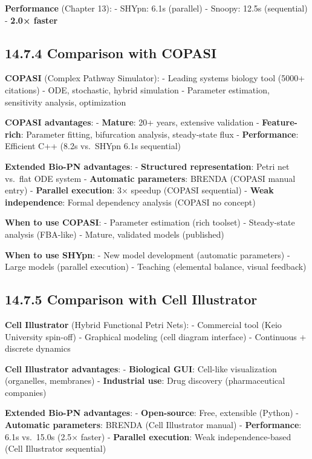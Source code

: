 \textbf{Performance} (Chapter 13): - SHYpn: 6.1s (parallel) - Snoopy:
12.5s (sequential) - \textbf{2.0× faster}

\hypertarget{comparison-with-copasi}{%
\subsection{14.7.4 Comparison with
COPASI}\label{comparison-with-copasi}}

\textbf{COPASI} (Complex Pathway Simulator): - Leading systems biology
tool (5000+ citations) - ODE, stochastic, hybrid simulation - Parameter
estimation, sensitivity analysis, optimization

\textbf{COPASI advantages}: - \textbf{Mature}: 20+ years, extensive
validation - \textbf{Feature-rich}: Parameter fitting, bifurcation
analysis, steady-state flux - \textbf{Performance}: Efficient C++ (8.2s
vs.~SHYpn 6.1s sequential)

\textbf{Extended Bio-PN advantages}: - \textbf{Structured
representation}: Petri net vs.~flat ODE system - \textbf{Automatic
parameters}: BRENDA (COPASI manual entry) - \textbf{Parallel execution}:
3× speedup (COPASI sequential) - \textbf{Weak independence}: Formal
dependency analysis (COPASI no concept)

\textbf{When to use COPASI}: - Parameter estimation (rich toolset) -
Steady-state analysis (FBA-like) - Mature, validated models (published)

\textbf{When to use SHYpn}: - New model development (automatic
parameters) - Large models (parallel execution) - Teaching (elemental
balance, visual feedback)

\hypertarget{comparison-with-cell-illustrator}{%
\subsection{14.7.5 Comparison with Cell
Illustrator}\label{comparison-with-cell-illustrator}}

\textbf{Cell Illustrator} (Hybrid Functional Petri Nets): - Commercial
tool (Keio University spin-off) - Graphical modeling (cell diagram
interface) - Continuous + discrete dynamics

\textbf{Cell Illustrator advantages}: - \textbf{Biological GUI}:
Cell-like visualization (organelles, membranes) - \textbf{Industrial
use}: Drug discovery (pharmaceutical companies)

\textbf{Extended Bio-PN advantages}: - \textbf{Open-source}: Free,
extensible (Python) - \textbf{Automatic parameters}: BRENDA (Cell
Illustrator manual) - \textbf{Performance}: 6.1s vs.~15.0s (2.5× faster)
- \textbf{Parallel execution}: Weak independence-based (Cell Illustrator
sequential)

